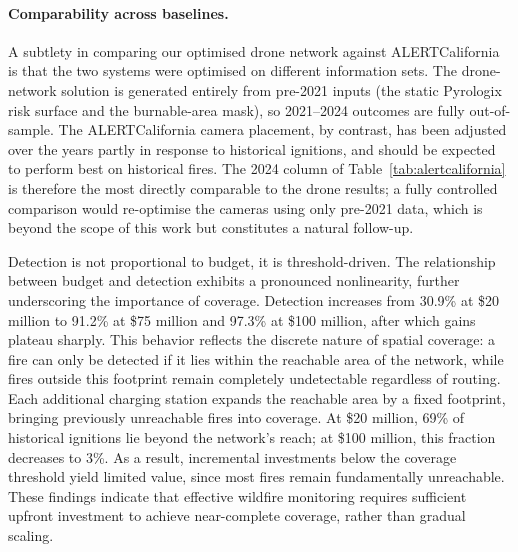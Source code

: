 \documentclass[pdflatex,sn-mathphys-num]{sn-jnl}%
\theoremstyle{thmstyleone}%
\theoremstyle{thmstyletwo}%
\theoremstyle{thmstylethree}%
\begin{document}
\paragraph{Comparability across baselines.}
A subtlety in comparing our optimised drone network against ALERTCalifornia is
that the two systems were optimised on different information sets. The
drone-network solution is generated entirely from pre-2021 inputs (the static
Pyrologix risk surface and the burnable-area mask), so 2021--2024 outcomes are
fully out-of-sample. The ALERTCalifornia camera placement, by contrast, has been
adjusted over the years partly in response to historical ignitions, and should be
expected to perform best on historical fires. The 2024 column of
Table~\ref{tab:alertcalifornia} is therefore the most directly comparable to the
drone results; a fully controlled comparison would re-optimise the cameras using
only pre-2021 data, which is beyond the scope of this work but constitutes a
natural follow-up.

Detection is not proportional to budget, it is threshold-driven. The relationship between budget and detection exhibits a pronounced nonlinearity, further underscoring the importance of coverage. Detection increases from 30.9\% at \$20 million to 91.2\% at \$75 million and 97.3\% at \$100 million, after which gains plateau sharply. This behavior reflects the discrete nature of spatial coverage: a fire can only be detected if it lies within the reachable area of the network, while fires outside this footprint remain completely undetectable regardless of routing. Each additional charging station expands the reachable area by a fixed footprint, bringing previously unreachable fires into coverage. At \$20 million, 69\% of historical ignitions lie beyond the network’s reach; at \$100 million, this fraction decreases to 3\%. As a result, incremental investments below the coverage threshold yield limited value, since most fires remain fundamentally unreachable. These findings indicate that effective wildfire monitoring requires sufficient upfront investment to achieve near-complete coverage, rather than gradual scaling.
\end{document}
